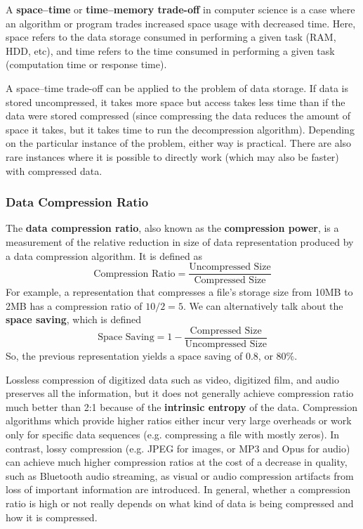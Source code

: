 \documentclass[a4paper, 12pt]{report}
\theoremstyle{remark}
\theoremstyle{definition}
\begin{document}
A \textbf{space–time} or \textbf{time–memory trade-off} in computer science is a case where an algorithm or program trades increased space usage with decreased time. Here, space refers to the data storage consumed in performing a given task (RAM, HDD, etc), and time refers to the time consumed in performing a given task (computation time or response time). 

A space–time trade-off can be applied to the problem of data storage. If data is stored uncompressed, it takes more space but access takes less time than if the data were stored compressed (since compressing the data reduces the amount of space it takes, but it takes time to run the decompression algorithm). Depending on the particular instance of the problem, either way is practical. There are also rare instances where it is possible to directly work (which may also be faster) with compressed data. 

\subsubsection{Data Compression Ratio}
The \textbf{data compression ratio}, also known as the \textbf{compression power}, is a measurement of the relative reduction in size of data representation produced by a data compression algorithm. It is defined as 
\[\text{Compression Ratio} = \frac{\text{Uncompressed Size}}{\text{Compressed Size}}\]
For example, a representation that compresses a file's storage size from 10MB to 2MB has a compression ratio of $10/2 = 5$. We can alternatively talk about the \textbf{space saving}, which is defined
\[\text{Space Saving} = 1 - \frac{\text{Compressed Size}}{\text{Uncompressed Size}}\]
So, the previous representation yields a space saving of 0.8, or $80\%$. 

Lossless compression of digitized data such as video, digitized film, and audio preserves all the information, but it does not generally achieve compression ratio much better than 2:1 because of the \textbf{intrinsic entropy} of the data. Compression algorithms which provide higher ratios either incur very large overheads or work only for specific data sequences (e.g. compressing a file with mostly zeros). In contrast, lossy compression (e.g. JPEG for images, or MP3 and Opus for audio) can achieve much higher compression ratios at the cost of a decrease in quality, such as Bluetooth audio streaming, as visual or audio compression artifacts from loss of important information are introduced. In general, whether a compression ratio is high or not really depends on what kind of data is being compressed and how it is compressed. 
\end{document}
